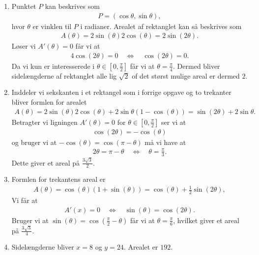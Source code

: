 \begin{enumerate}
	\item Punktet $P$ kan beskrives som
	\begin{align*}
	P=(\cos \theta,\sin\theta),
	\end{align*}
	hvor $\theta$ er vinklen til $P$ i radianer. Arealet af rektanglet kan så beskrives som
	\begin{align*}
	A(\theta)=2\sin(\theta)2\cos(\theta)=2\sin(2\theta).
	\end{align*}
	Løser vi $A'(\theta)=0$ får vi at 
	\begin{align*}
	4\cos(2\theta)=0\quad\Leftrightarrow\quad \cos(2\theta)=0.
	\end{align*}
	Da vi kun er interesserede i $\theta\in [0,\frac{\pi}{2}]$ får vi at $\theta=\frac{\pi}{4}$. Dermed bliver sidelængderne af rektanglet alle lig $\sqrt{2}$ of det størst mulige areal er dermed $2$.
	
	
	\item Inddeler vi sekskanten i et rektangel som i forrige opgave og to trekanter bliver formlen for arealet
	\begin{align*}
	A(\theta)=2\sin(\theta)2\cos(\theta)+2\sin\theta(1-\cos(\theta))=\sin(2\theta)+2\sin \theta.
	\end{align*}
	Betragter vi ligningen $A'(\theta)=0$ for $\theta\in [0,\frac{\pi}{2}]$ ser vi at
	\begin{align*}
	\cos(2\theta)=-\cos(\theta)
	\end{align*}
	og bruger vi at $-\cos(\theta)=\cos(\pi-\theta)$ må vi have at 
	\begin{align*}
	2\theta=\pi-\theta \quad\Leftrightarrow\quad \theta=\frac{\pi}{3}.
	\end{align*}
	Dette giver et areal på $\frac{3\sqrt{3}}{2}$.
	
	
	
	\item Formlen for trekantens areal er 
	\begin{align*}
	A(\theta)=\cos(\theta)(1+\sin(\theta))=\cos(\theta)+\frac{1}{2}\sin(2\theta),
	\end{align*}
	Vi får at
	\begin{align*}
	A'(x)=0\quad\Leftrightarrow\quad \sin(\theta)=\cos(2\theta).
	\end{align*}	
	Bruger vi at $\sin(\theta)=\cos(\frac{\pi}{2}-\theta)$ får vi at $\theta=\frac{\pi}{6}$, hvilket giver et areal på $\frac{3\sqrt{3}}{4} $.
	
	
	\item Sidelængderne bliver $x=8$ og $y=24$. Arealet er $192$. 
	

\end{enumerate}
